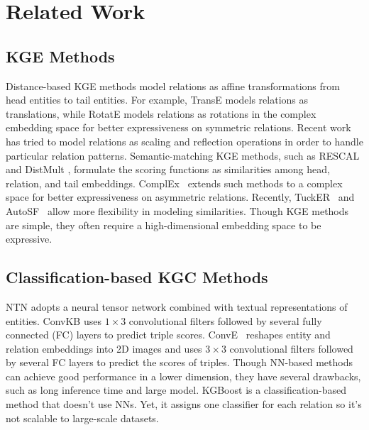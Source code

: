 \documentclass{article}
\begin{document}
\renewcommand{\figurename}{Figure}
\renewcommand{\tablename}{Table}

\section{Related Work}\label{sec:review}

\subsection{KGE Methods}

Distance-based KGE methods model relations as affine transformations from head entities to
tail entities. For example, TransE \citep{bordes2013translating} models relations as 
translations, while RotatE \citep{sun2018rotate} models relations as rotations in 
the complex embedding space for better expressiveness on symmetric relations. 
Recent work has tried to model relations as scaling \citep{chao2021pairre} and reflection 
\citep{zhang2022knowledge} operations in order to handle particular relation patterns. 
Semantic-matching KGE methods, such as RESCAL \citep{lin2015learning} and DistMult 
\citep{bordes2014semantic}, formulate the scoring functions as similarities 
among head, relation, and tail embeddings. ComplEx~\citep{trouillon2016complex} 
extends such methods to a complex space for better expressiveness on asymmetric relations. 
Recently, TuckER~\citep{balazevic2019tucker} and AutoSF~\citep{zhang2020autosf} allow 
more flexibility in modeling similarities. Though KGE methods are simple, 
they often require a high-dimensional embedding space to be expressive.


\subsection{Classification-based KGC Methods}

NTN \citep{socher2013reasoning} adopts a neural 
tensor network combined with textual representations of entities. 
ConvKB \citep{nguyen2018novel} uses $1 \times 3$
convolutional filters followed by several fully connected
(FC) layers to predict triple scores.  ConvE~\citep{dettmers2018convolutional} reshapes entity and relation
embeddings into 2D images and uses $3 \times 3$ convolutional filters
followed by several FC layers to predict the scores of triples. 
Though NN-based methods can achieve good performance in a lower dimension,
they have several drawbacks, such as long inference time and large model. 
KGBoost \citep{wang2022kgboost} is a classification-based method that doesn't
use NNs. Yet, it assigns one classifier for each relation so it's not scalable
to large-scale datasets.
\end{document}
